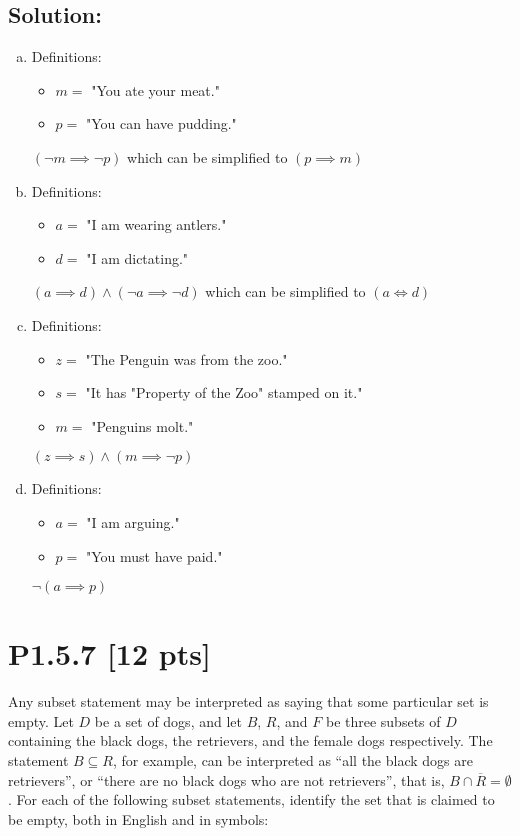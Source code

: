\documentclass[12pt]{article}
\begin{document}
\subsection*{\textbf{Solution:}}
\begin{enumerate}[(a)]
    \item Definitions:
	\begin{itemize}
	  \item $m =$ "You ate your meat."
	  \item $p =$ "You can have pudding."
	\end{itemize}
	$(\neg m \implies \neg p)$ which can be simplified to $(p \implies m)$

    \item Definitions:
	\begin{itemize}
	  \item $a =$ "I am wearing antlers."
	  \item $d =$ "I am dictating."
	\end{itemize}
	$(a \implies d) \land (\neg a \implies \neg d)$ which can be simplified to $(a \iff d)$

    \item Definitions:
	\begin{itemize}
	  \item $z =$ "The Penguin was from the zoo."
	  \item $s =$ "It has "Property of the Zoo" stamped on it."
	  \item $m =$ "Penguins molt."
	\end{itemize}
	$(z \implies s) \land (m \implies \neg p)$

    \item Definitions:
	\begin{itemize}
	  \item $a =$ "I am arguing."
	  \item $p =$ "You must have paid."
	\end{itemize}
	$\neg(a \implies p)$

\end{enumerate}


\newpage
\section*{\textbf{P1.5.7} [12 pts]}
Any subset statement may be interpreted as saying that some particular set is empty. Let $D$ be a set of dogs, and let $B$, $R$, and $F$ be three subsets of $D$ containing the black dogs, the retrievers, and the female dogs respectively. The statement $B \subseteq R$, for example, can be interpreted as “all the black dogs are retrievers”, or “there are no black dogs who are not retrievers”, that is, $B \cap \overline{R} = \emptyset$. For each of the following subset statements, identify the set that is claimed to be empty, both in English and in symbols:
\end{document}
